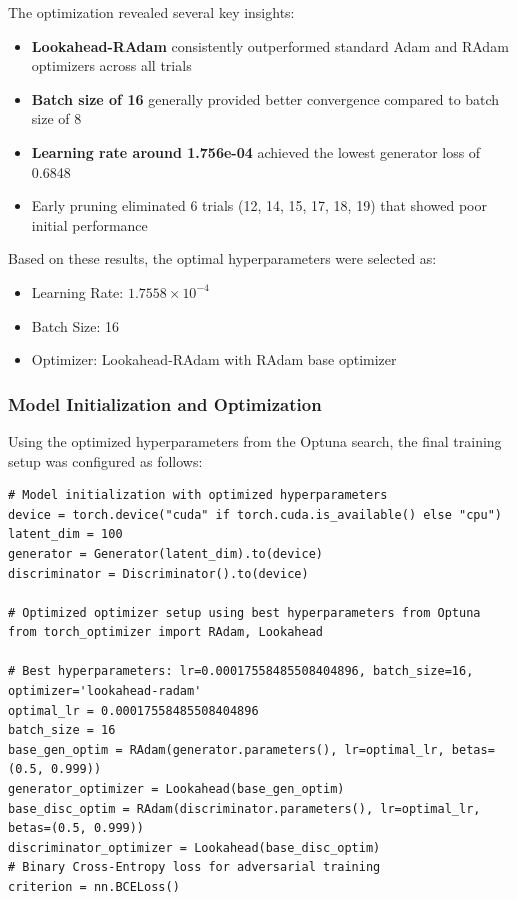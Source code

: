 \documentclass[a4paper, journal]{IEEEtran}
\begin{document}
The optimization revealed several key insights:
\begin{itemize}
    \item \textbf{Lookahead-RAdam} consistently outperformed standard Adam and RAdam optimizers across all trials
    \item \textbf{Batch size of 16} generally provided better convergence compared to batch size of 8
    \item \textbf{Learning rate around 1.756e-04} achieved the lowest generator loss of 0.6848
    \item Early pruning eliminated 6 trials (12, 14, 15, 17, 18, 19) that showed poor initial performance
\end{itemize}

Based on these results, the optimal hyperparameters were selected as:
\begin{itemize}
    \item Learning Rate: $1.7558 \times 10^{-4}$
    \item Batch Size: 16
    \item Optimizer: Lookahead-RAdam with RAdam base optimizer
\end{itemize}

\subsubsection{Model Initialization and Optimization}
Using the optimized hyperparameters from the Optuna search, the final training setup was configured as follows:

\begin{lstlisting}[caption=Optimized Model Configuration]
# Model initialization with optimized hyperparameters
device = torch.device("cuda" if torch.cuda.is_available() else "cpu")
latent_dim = 100
generator = Generator(latent_dim).to(device)
discriminator = Discriminator().to(device)

# Optimized optimizer setup using best hyperparameters from Optuna
from torch_optimizer import RAdam, Lookahead

# Best hyperparameters: lr=0.00017558485508404896, batch_size=16, optimizer='lookahead-radam'
optimal_lr = 0.00017558485508404896
batch_size = 16
base_gen_optim = RAdam(generator.parameters(), lr=optimal_lr, betas=(0.5, 0.999))
generator_optimizer = Lookahead(base_gen_optim)
base_disc_optim = RAdam(discriminator.parameters(), lr=optimal_lr, betas=(0.5, 0.999))
discriminator_optimizer = Lookahead(base_disc_optim)
# Binary Cross-Entropy loss for adversarial training
criterion = nn.BCELoss()
\end{lstlisting}
\end{document}

